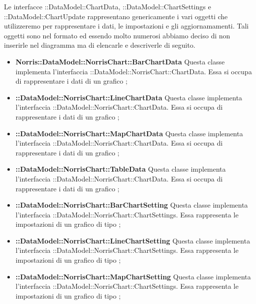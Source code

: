 	Le interfacce ::DataModel::ChartData, ::DataModel::ChartSettings e ::DataModel::ChartUpdate rappresentano genericamente i vari oggetti che utilizzeremo per rappresentare i dati, le impostazioni e gli aggiornamamenti. Tali oggetti sono nel formato  ed essendo molto numerosi abbiamo deciso di non inserirle nel diagramma ma di elencarle e descriverle di seguito.

	\begin{itemize}
		\item \textbf{Norris::DataModel::NorrisChart::BarChartData} Questa classe implementa l'interfaccia ::DataModel::NorrisChart::ChartData. Essa si occupa di rappresentare i dati di un grafico ;

		\item \textbf{::DataModel::NorrisChart::LineChartData} Questa classe implementa l'interfaccia ::DataModel::NorrisChart::ChartData. Essa si occupa di rappresentare i dati di un grafico ;

		\item \textbf{::DataModel::NorrisChart::MapChartData} Questa classe implementa l'interfaccia ::DataModel::NorrisChart::ChartData. Essa si occupa di rappresentare i dati di un grafico ;

		\item \textbf{::DataModel::NorrisChart::TableData} Questa classe implementa l'interfaccia \linebreak {}::DataModel::NorrisChart::ChartData. Essa si occupa di rappresentare i dati di un grafico ;

		\item \textbf{::DataModel::NorrisChart::BarChartSetting} Questa classe implementa l'interfaccia ::DataModel::NorrisChart::ChartSettings. Essa rappresenta le impostazioni di un grafico di tipo ;

		\item \textbf{::DataModel::NorrisChart::LineChartSetting} Questa classe implementa l'interfaccia ::DataModel::NorrisChart::ChartSettings. Essa rappresenta le impostazioni di un grafico di tipo ;

		\item \textbf{::DataModel::NorrisChart::MapChartSetting} Questa classe implementa l'interfaccia ::DataModel::NorrisChart::ChartSettings. Essa rappresenta le impostazioni di un grafico di tipo ;


\end{itemize}
